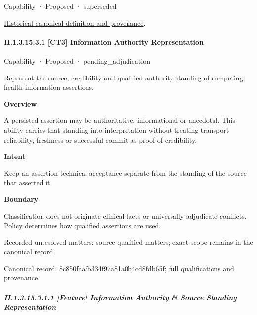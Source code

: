 \label{element:3811c758ff2140c39a801bf89f75098a}
{\small Capability · Proposed · superseded}\par
\href{../../../../continuum/strategy/capability/3811c758ff2140c39a801bf89f75098a.md}{Historical canonical definition and provenance}.\par
\paragraph*{II.1.3.15.3.1 [CT3] Information Authority Representation}
\label{navigation:II.1.3.15.3.1}

\label{element:8c850faafb334f97a81a0b4cd8fdb65f}
{\small Capability · Proposed · pending\_adjudication}\par

Represent the source, credibility and qualified authority standing of competing health-information assertions.



\textbf{Overview}



A persisted assertion may be authoritative, informational or anecdotal. This ability carries that standing into interpretation without treating transport reliability, freshness or successful commit as proof of credibility.



\textbf{Intent}



Keep an assertion technical acceptance separate from the standing of the source that asserted it.



\textbf{Boundary}



Classification does not originate clinical facts or universally adjudicate conflicts. Policy determines how qualified assertions are used.


{\small Recorded unresolved matters: source-qualified matters; exact scope remains in the canonical record.}\par
{\footnotesize \href{../../../../continuum/strategy/capability/8c850faafb334f97a81a0b4cd8fdb65f.md}{Canonical record: 8c850faafb334f97a81a0b4cd8fdb65f}; full qualifications and provenance.}\par
\subparagraph*{II.1.3.15.3.1.1 [Feature] Information Authority \& Source Standing Representation}
\label{navigation:II.1.3.15.3.1.1}

